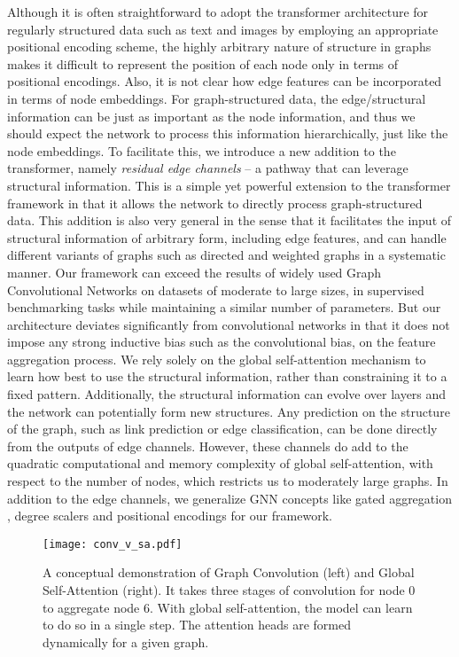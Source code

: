 \documentclass[sigconf,authorversion]{acmart}
\begin{document}
Although it is often straightforward to adopt the transformer architecture for regularly structured data such as text and images by employing an appropriate positional encoding scheme, the highly arbitrary nature of structure in graphs makes it difficult to represent the position of each node only in terms of positional encodings. Also, it is not clear how edge features can be incorporated in terms of node embeddings. For graph-structured data, the edge/structural information can be just as important as the node information, and thus we should expect the network to process this information hierarchically, just like the node embeddings. To facilitate this, we introduce a new addition to the transformer, namely \emph{residual edge channels} -- a pathway that can leverage structural information. This is a simple yet powerful extension to the transformer framework in that it allows the network to directly process graph-structured data. This addition is also very general in the sense that it facilitates the input of structural information of arbitrary form, including edge features, and can handle different variants of graphs such as directed and weighted graphs in a systematic manner. Our framework can exceed the results of widely used Graph Convolutional Networks on datasets of moderate to large sizes, in supervised benchmarking tasks while maintaining a similar number of parameters. But our architecture deviates significantly from convolutional networks in that it does not impose any strong inductive bias such as the convolutional bias, on the feature aggregation process. We rely solely on the global self-attention mechanism to learn how best to use the structural information, rather than constraining it to a fixed pattern. Additionally, the structural information can evolve over layers and the network can potentially form new structures. Any prediction on the structure of the graph, such as link prediction or edge classification, can be done directly from the outputs of edge channels. However, these channels do add to the quadratic computational and memory complexity of global self-attention, with respect to the number of nodes, which restricts us to moderately large graphs. In addition to the edge channels, we generalize GNN concepts like gated aggregation \citep{bresson2017residual}, degree scalers \citep{corso2020principal} and positional encodings \cite{dwivedi2020benchmarking} for our framework.

\begin{figure}[!t]
  \centering
  \texttt{[image: conv\_v\_sa.pdf]}
  \caption{A conceptual demonstration of Graph Convolution (left) and Global Self-Attention (right). It takes three stages of convolution for node 0 to aggregate node 6. With global self-attention, the model can learn to do so in a single step. The attention heads are formed dynamically for a given graph.}
  \label{fig:conv_v_sa}
\end{figure}
\end{document}
